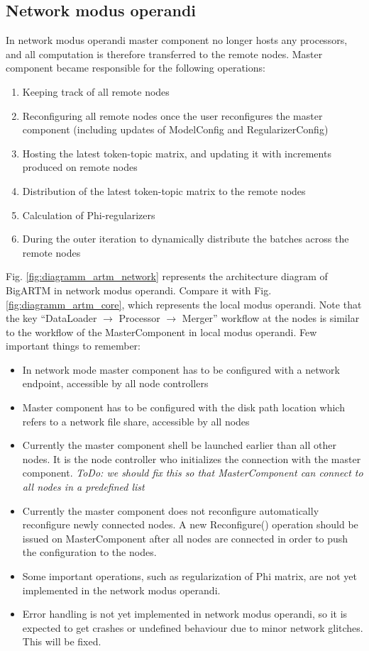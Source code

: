 \documentclass[11pt,a4paper,twoside]{report}
\begin{document}
\subsection{Network modus operandi}
\label{label:network_modus_operandi}

In network modus operandi master component no longer hosts any processors,
and all computation is therefore transferred to the remote nodes.
Master component became responsible for the following operations:
\begin{enumerate}
\item Keeping track of all remote nodes
\item Reconfiguring all remote nodes once the user reconfigures the master component 
      (including updates of ModelConfig and RegularizerConfig)
\item Hosting the latest token-topic matrix, and updating it with increments produced on remote nodes
\item Distribution of the latest token-topic matrix to the remote nodes
\item Calculation of Phi-regularizers
\item During the outer iteration to dynamically distribute the batches across the remote nodes
\end{enumerate}

Fig. \ref{fig:diagramm_artm_network} represents the architecture diagram of BigARTM in network modus operandi.
Compare it with Fig. \ref{fig:diagramm_artm_core}, which represents the local modus operandi.
Note that the key  ``DataLoader $\rightarrow$ Processor $\rightarrow$ Merger'' workflow 
at the nodes is similar to the workflow of the MasterComponent in local modus operandi.
Few important things to remember:
\begin{itemize}
    \item In network mode master component has to be configured with a network endpoint, 
          accessible by all node controllers
    \item Master component has to be configured with the disk path location which refers 
          to a network file share, accessible by all nodes
    \item Currently the master component shell be launched earlier than all other nodes. 
          It is the node controller who initializes the connection with the master component.
          \emph{ToDo: we should fix this so that MasterComponent can connect to all nodes in a predefined list}
    \item Currently the master component does not reconfigure automatically reconfigure newly connected nodes.
          A new Reconfigure() operation should be issued on MasterComponent
          after all nodes are connected in order to push the configuration to the nodes.
    \item Some important operations, such as regularization of Phi matrix, 
          are not yet implemented in the network modus operandi.
    \item Error handling is not yet implemented in network modus operandi,
          so it is expected to get crashes or undefined behaviour due to minor network glitches.
          This will be fixed.
\end{itemize}
\end{document}
